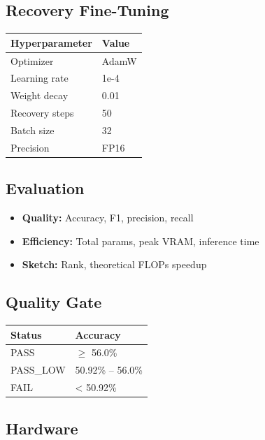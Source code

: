 \subsection{Recovery Fine-Tuning}

\begin{table}[H]
\centering
\small
\begin{tabular}{ll}
\toprule
\textbf{Hyperparameter} & \textbf{Value} \\
\midrule
Optimizer & AdamW \\
Learning rate & 1e-4 \\
Weight decay & 0.01 \\
Recovery steps & 50 \\
Batch size & 32 \\
Precision & FP16 \\
\bottomrule
\end{tabular}
\end{table}

\subsection{Evaluation}

\begin{itemize}
\item \textbf{Quality:} Accuracy, F1, precision, recall
\item \textbf{Efficiency:} Total params, peak VRAM, inference time
\item \textbf{Sketch:} Rank, theoretical FLOPs speedup

\end{itemize}
\subsection{Quality Gate}

\begin{table}[H]
\centering
\small
\begin{tabular}{ll}
\toprule
\textbf{Status} & \textbf{Accuracy} \\
\midrule
PASS & $\ge$ 56.0\% \\
PASS\_LOW & 50.92\% -- 56.0\% \\
FAIL & \textless{} 50.92\% \\
\bottomrule
\end{tabular}
\end{table}

\subsection{Hardware}

